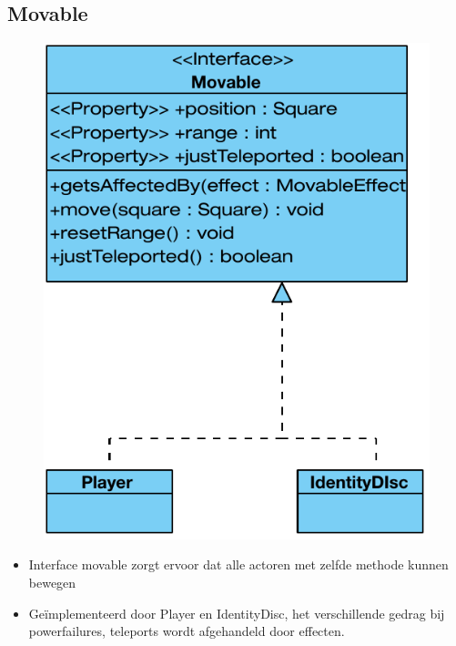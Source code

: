 \documentclass[t]{beamer}
\begin{document}
\subsection{Movable}
\begin{frame}
\begin{multicols}{2}
\begin{minipage}{\columnwidth}
\begin{figure}
	\center
	\includegraphics[width=\linewidth]{img/movable}
\end{figure}
\end{minipage}
\begin{minipage}{\columnwidth}
\begin{itemize}
	\item Interface movable zorgt ervoor dat alle actoren met zelfde methode kunnen bewegen 
	\item Ge\"implementeerd door Player en IdentityDisc, het verschillende gedrag bij powerfailures, teleports wordt afgehandeld door effecten.
\end{itemize}
\end{minipage}
\end{multicols}
\end{frame}
\end{document}
